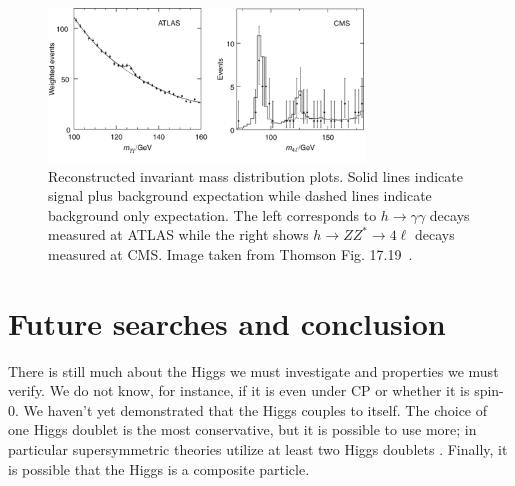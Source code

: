 \begin{figure}
  \centering
  \includegraphics[width=0.75\textwidth,height=0.75\textheight,keepaspectratio]
                {pictures/higgs_results.png}
  \caption{Reconstructed invariant mass distribution plots. Solid lines
           indicate signal plus background expectation while dashed lines
           indicate background only expectation. The left corresponds to 
           $h\to\gamma\gamma$ decays measured at ATLAS while the right shows
           $h\to ZZ^{*}\to4\ell$ decays measured at CMS. Image taken from 
           Thomson Fig. 17.19~\cite{thomson_modern_2013}.}
  \label{fig:higgsevidence}
\end{figure}

\section{Future searches and conclusion}
There is still much about the
Higgs we must investigate and properties we must verify. We do not know, for
instance, if it is even under CP or whether it is spin-0. We 
haven't yet demonstrated that the Higgs couples to itself. The choice of one 
Higgs doublet is the most conservative, but it is possible to use more; in 
particular supersymmetric theories utilize at least two Higgs doublets 
\cite{thomson_modern_2013}. Finally, it is possible that the 
Higgs is a composite particle. 



                               

